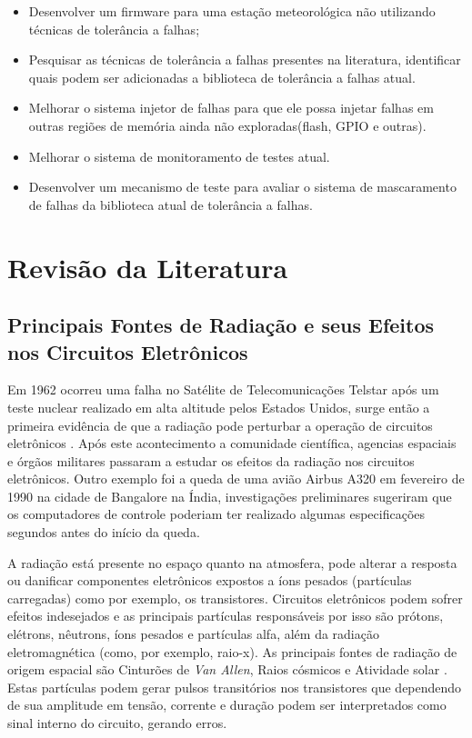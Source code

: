 \documentclass[a4paper,12pt,brazil]{ufms-cpcx}
\begin{document}
\begin{itemize}
	
	
	
	\item Desenvolver um firmware para uma estação meteorológica não utilizando técnicas de tolerância a falhas;
	
	\item Pesquisar as técnicas de tolerância a falhas presentes na literatura, identificar quais podem ser adicionadas a biblioteca de tolerância a falhas atual. 
	
	\item Melhorar o sistema injetor de falhas para que ele possa injetar falhas em outras regiões de memória ainda não exploradas(flash, GPIO e outras).	
	
	\item Melhorar o sistema de monitoramento de testes atual.
	
	\item Desenvolver um mecanismo de teste para avaliar o sistema de mascaramento de falhas da biblioteca atual de tolerância a falhas.



\end{itemize}

\chapter{Revisão da Literatura}

\section{Principais Fontes de Radiação e seus Efeitos nos Circuitos Eletrônicos}

		Em 1962 ocorreu uma falha no Satélite de Telecomunicações Telstar após um teste nuclear realizado em alta altitude pelos Estados Unidos, surge então a primeira evidência de que a radiação pode perturbar a operação de circuitos eletrônicos \cite{Velazco:2007}. Após este acontecimento a comunidade científica, agencias espaciais e órgãos militares passaram a estudar os efeitos da radiação nos circuitos eletrônicos. Outro exemplo foi a queda de uma avião Airbus A320 em fevereiro de 1990 na cidade de Bangalore na Índia, investigações preliminares sugeriram que os computadores de controle poderiam ter realizado algumas especificações segundos antes do início da queda.
		
		A radiação está presente no espaço quanto na atmosfera, pode alterar a resposta ou danificar componentes eletrônicos expostos a íons pesados (partículas carregadas) como por exemplo, os transistores. Circuitos eletrônicos podem sofrer efeitos indesejados e as principais partículas responsáveis por isso são prótons, elétrons, nêutrons, íons pesados e partículas alfa, além da radiação eletromagnética (como, por exemplo, raio-x). As principais fontes de radiação de origem espacial são Cinturões de \textit{Van Allen}, Raios cósmicos \cite{Stassinopoulos:1988} e Atividade solar \cite{Boudenot:2007}. Estas partículas podem gerar pulsos transitórios nos transistores que dependendo de sua amplitude em tensão, corrente e duração podem ser interpretados como sinal interno do circuito, gerando erros. 
\end{document}
